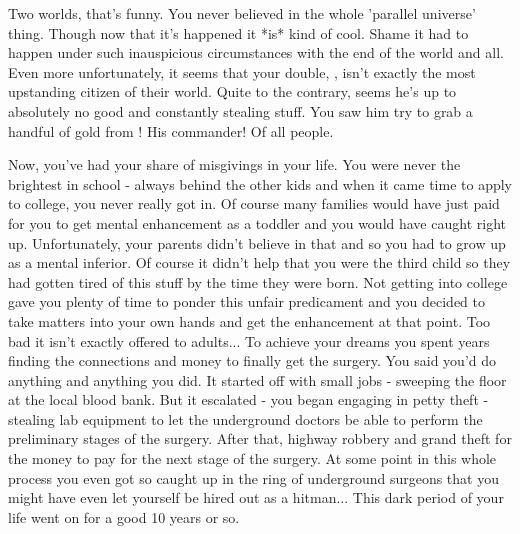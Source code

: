 \documentclass[char]{guildcamp3}
\begin{document}
\name{\cSpecOpOne{}}

\updatemacro{\cNPC}{
  \unknownplayer %
  }



Two worlds, that's funny. You never believed in the whole 'parallel universe' thing. Though now that it's happened it *is* kind of cool. Shame it had to happen under such inauspicious circumstances with the end of the world and all. Even more unfortunately, it seems that your double, \cRogueTwo{\intro}, isn't exactly the most upstanding citizen of their world. Quite to the contrary, seems he's up to absolutely no good and constantly stealing stuff. You saw him try to grab a handful of gold from \cNobleTwo{\intro}! His commander! Of all people. 

Now, you've had your share of misgivings in your life. You were never the brightest in school - always behind the other kids and when it came time to apply to college, you never really got in. Of course many families would have just paid for you to get mental enhancement as a toddler and you would have caught right up. Unfortunately, your parents didn't believe in that and so you had to grow up as a mental inferior. Of course it didn't help that you were the third child so they had gotten tired of this stuff by the time they were born. Not getting into college gave you plenty of time to ponder this unfair predicament and you decided to take matters into your own hands and get the enhancement at that point. Too bad it isn't exactly offered to adults... To achieve your dreams you spent years finding the connections and money to finally get the surgery. You said you'd do anything and anything you did. It started off with small jobs - sweeping the floor at the local blood bank. But it escalated - you began engaging in petty theft - stealing lab equipment to let the underground doctors be able to perform the preliminary stages of the surgery. After that, highway robbery and grand theft for the money to pay for the next stage of the surgery. At some point in this whole process you even got so caught up in the ring of underground surgeons that you might have even let yourself be hired out as a hitman... This dark period of your life went on for a good 10 years or so.
\end{document}
